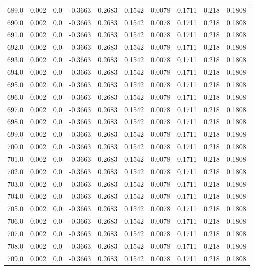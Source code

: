 \begin{longtable}{lrrrrrrrrr}
689.0 & 0.002 & 0.0 & -0.3663 & 0.2683 & 0.1542 & 0.0078 & 0.1711 & 0.218 & 0.1808 \\
690.0 & 0.002 & 0.0 & -0.3663 & 0.2683 & 0.1542 & 0.0078 & 0.1711 & 0.218 & 0.1808 \\
691.0 & 0.002 & 0.0 & -0.3663 & 0.2683 & 0.1542 & 0.0078 & 0.1711 & 0.218 & 0.1808 \\
692.0 & 0.002 & 0.0 & -0.3663 & 0.2683 & 0.1542 & 0.0078 & 0.1711 & 0.218 & 0.1808 \\
693.0 & 0.002 & 0.0 & -0.3663 & 0.2683 & 0.1542 & 0.0078 & 0.1711 & 0.218 & 0.1808 \\
694.0 & 0.002 & 0.0 & -0.3663 & 0.2683 & 0.1542 & 0.0078 & 0.1711 & 0.218 & 0.1808 \\
695.0 & 0.002 & 0.0 & -0.3663 & 0.2683 & 0.1542 & 0.0078 & 0.1711 & 0.218 & 0.1808 \\
696.0 & 0.002 & 0.0 & -0.3663 & 0.2683 & 0.1542 & 0.0078 & 0.1711 & 0.218 & 0.1808 \\
697.0 & 0.002 & 0.0 & -0.3663 & 0.2683 & 0.1542 & 0.0078 & 0.1711 & 0.218 & 0.1808 \\
698.0 & 0.002 & 0.0 & -0.3663 & 0.2683 & 0.1542 & 0.0078 & 0.1711 & 0.218 & 0.1808 \\
699.0 & 0.002 & 0.0 & -0.3663 & 0.2683 & 0.1542 & 0.0078 & 0.1711 & 0.218 & 0.1808 \\
700.0 & 0.002 & 0.0 & -0.3663 & 0.2683 & 0.1542 & 0.0078 & 0.1711 & 0.218 & 0.1808 \\
701.0 & 0.002 & 0.0 & -0.3663 & 0.2683 & 0.1542 & 0.0078 & 0.1711 & 0.218 & 0.1808 \\
702.0 & 0.002 & 0.0 & -0.3663 & 0.2683 & 0.1542 & 0.0078 & 0.1711 & 0.218 & 0.1808 \\
703.0 & 0.002 & 0.0 & -0.3663 & 0.2683 & 0.1542 & 0.0078 & 0.1711 & 0.218 & 0.1808 \\
704.0 & 0.002 & 0.0 & -0.3663 & 0.2683 & 0.1542 & 0.0078 & 0.1711 & 0.218 & 0.1808 \\
705.0 & 0.002 & 0.0 & -0.3663 & 0.2683 & 0.1542 & 0.0078 & 0.1711 & 0.218 & 0.1808 \\
706.0 & 0.002 & 0.0 & -0.3663 & 0.2683 & 0.1542 & 0.0078 & 0.1711 & 0.218 & 0.1808 \\
707.0 & 0.002 & 0.0 & -0.3663 & 0.2683 & 0.1542 & 0.0078 & 0.1711 & 0.218 & 0.1808 \\
708.0 & 0.002 & 0.0 & -0.3663 & 0.2683 & 0.1542 & 0.0078 & 0.1711 & 0.218 & 0.1808 \\
709.0 & 0.002 & 0.0 & -0.3663 & 0.2683 & 0.1542 & 0.0078 & 0.1711 & 0.218 & 0.1808 \\

\end{longtable}
